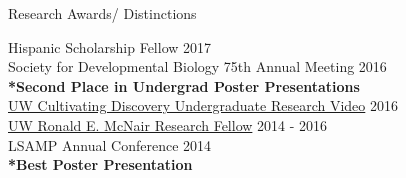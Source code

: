 \documentclass{resume} %
\newcommand\ntab[1][.25cm]{\hspace*{#1}}
\begin{document}
\begin{rSection}{Research Awards/ Distinctions}

Hispanic Scholarship Fellow	\hfill	2017 \\
Society for Developmental Biology 75th Annual Meeting \hfill 2016\\
\ntab \textbf{*Second Place in Undergrad Poster Presentations} \\
\href{https://www.youtube.com/watch?v=eRAfphm7Eac&t=16s}{UW Cultivating Discovery Undergraduate Research Video} \hfill 2016 \\
\href{http://depts.washington.edu/uwmcnair/meet-our-scholars/2015-2016-scholars/}{UW Ronald E. McNair Research Fellow} \hfill 2014 - 2016 \\
LSAMP Annual Conference  \hfill 2014 \\
\ntab \textbf{*Best Poster Presentation}

\end{rSection}
\end{document}
